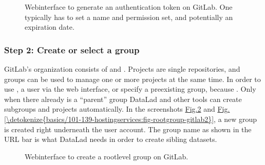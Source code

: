 \begin{figure}[tbp]
\centering
\capstart

\noindent{}
\caption{Webinterface to generate an authentication token on GitLab. One typically has to set a name and
permission set, and potentially an expiration date.}\label{\detokenize{basics/101-139-hostingservices:id9}}\end{figure}


\subsubsection{Step 2: Create or select a group}
\label{\detokenize{basics/101-139-hostingservices:step-2-create-or-select-a-group}}
\sphinxAtStartPar
GitLab’s organization consists of  and .
Projects are single repositories, and groups can be used to manage one or more projects at the same time.
In order to use , a user   via the web interface, or specify a pre\sphinxhyphen{}existing group, because .
Only when there already is a “parent” group DataLad and other tools can create sub\sphinxhyphen{}groups and projects automatically.
In the screenshots \hyperref[\detokenize{basics/101-139-hostingservices:fig-rootgroup-gitlab1}]{Fig.\@ \ref{\detokenize{basics/101-139-hostingservices:fig-rootgroup-gitlab1}}} and \hyperref[\detokenize{basics/101-139-hostingservices:fig-rootgroup-gitlab2}]{Fig.\@ \ref{\detokenize{basics/101-139-hostingservices:fig-rootgroup-gitlab2}}}, a new group  is created right underneath the user account.
The group name as shown in the URL bar is what DataLad needs in order to create sibling datasets.

\begin{figure}[tbp]
\centering
\capstart

\noindent{}
\caption{Webinterface to create a root\sphinxhyphen{}level group on GitLab.}\label{\detokenize{basics/101-139-hostingservices:id10}}\label{\detokenize{basics/101-139-hostingservices:fig-rootgroup-gitlab1}}\end{figure}

